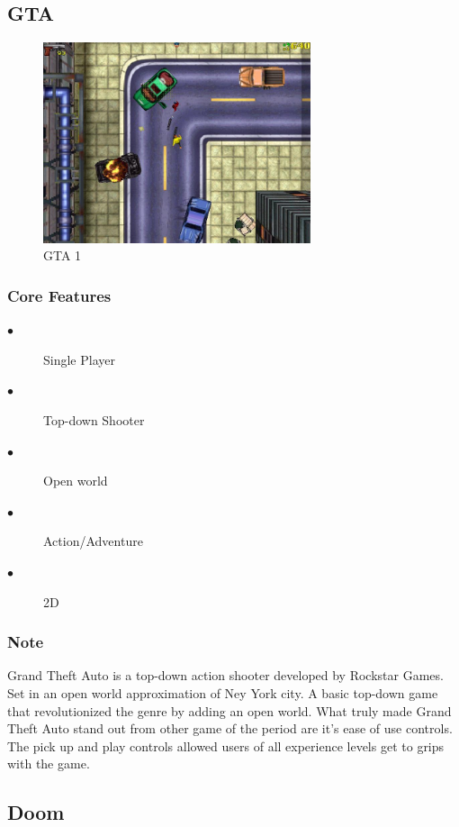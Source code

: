 \documentclass[a4paper]{scrreprt}
\begin{document}
\subsection{GTA}

\begin{figure}[H]
\centering
\includegraphics[width=0.70\textwidth]{gta1.jpg}
\caption{\label{fig:art} GTA 1}
\end{figure}

\subsubsection{Core Features}
\begin{description}
\item[$\bullet$] Single Player
\item[$\bullet$] Top-down Shooter
\item[$\bullet$] Open world
\item[$\bullet$] Action/Adventure
\item[$\bullet$] 2D
\end{description}

\subsubsection{Note}
Grand Theft Auto is a top-down action shooter developed by Rockstar Games. Set in an open world approximation of Ney York city.
A basic top-down game that revolutionized the genre by adding an open world.
What truly made Grand Theft Auto stand out from other game of the period are it's ease of use controls. 
The pick up and play controls allowed users of all experience levels get to grips with the game.

\subsection{Doom}
\end{document}
